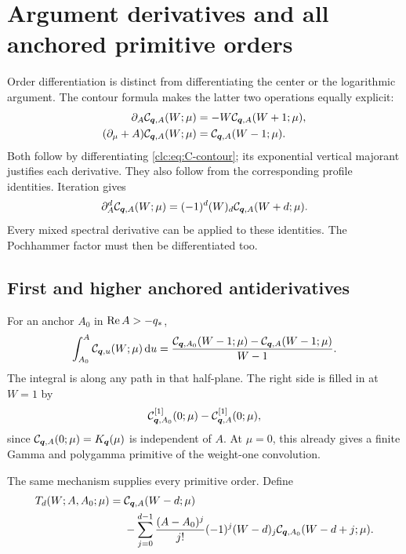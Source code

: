 \section{Argument derivatives and all anchored primitive orders}
\label{clc:sec:primitives}

Order differentiation is distinct from differentiating the center or
the logarithmic argument. The contour formula makes the latter two
operations equally explicit:
\begin{align}
 \partial_A\mathcal C_{\boldsymbol q,A}(W;\mu)
      &=-W\mathcal C_{\boldsymbol q,A}(W+1;\mu),\label{clc:eq:A-ladder}\\
 (\partial_\mu+A)\mathcal C_{\boldsymbol q,A}(W;\mu)
      &=\mathcal C_{\boldsymbol q,A}(W-1;\mu).
 \label{clc:eq:mu-ladder}
\end{align}
Both follow by differentiating \eqref{clc:eq:C-contour}; its exponential
vertical majorant justifies each derivative. They also follow from the
corresponding profile identities. Iteration gives
\begin{equation}\label{clc:eq:A-higher}
 \partial_A^d\mathcal C_{\boldsymbol q,A}(W;\mu)
       =(-1)^d(W)_d\mathcal C_{\boldsymbol q,A}(W+d;\mu).
\end{equation}
Every mixed spectral derivative can be applied to these identities.
The Pochhammer factor must then be differentiated too.

\subsection{First and higher anchored antiderivatives}
For an anchor $A_0$ in $\operatorname{Re} A>-q_*$,
\begin{equation}\label{clc:eq:first-primitive}
 \int_{A_0}^A\mathcal C_{\boldsymbol q,u}(W;\mu)\,\mathrm d u
 =\frac{\mathcal C_{\boldsymbol q,A_0}(W-1;\mu)
                  -\mathcal C_{\boldsymbol q,A}(W-1;\mu)}{W-1}.
\end{equation}
The integral is along any path in that half-plane. The right side is
filled in at $W=1$ by
\begin{equation}\label{clc:eq:first-resonant}
 \mathcal C_{\boldsymbol q,A_0}^{[1]}(0;\mu)-\mathcal C_{\boldsymbol q,A}^{[1]}(0;\mu),
\end{equation}
since $\mathcal C_{\boldsymbol q,A}(0;\mu)=K_{\boldsymbol q}(\mu)$ is independent of $A$.
At $\mu=0$, this already gives a finite Gamma and polygamma primitive
of the weight-one convolution.

The same mechanism supplies every primitive order. Define
\begin{align}
 T_d(W;A,A_0;\mu)={}&\mathcal C_{\boldsymbol q,A}(W-d;\mu)\notag\\
 &-\sum_{j=0}^{d-1}\frac{(A-A_0)^j}{j!}(-1)^j(W-d)_j
             \mathcal C_{\boldsymbol q,A_0}(W-d+j;\mu).
 \label{clc:eq:T-d}
\end{align}

